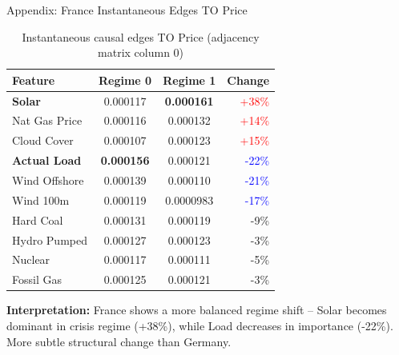 \documentclass[aspectratio=169]{beamer}
\begin{document}
\begin{frame}{Appendix: France Instantaneous Edges TO Price}
\begin{table}
\centering
\scriptsize
\begin{tabular}{l|c|c|r}
\toprule
\textbf{Feature} & \textbf{Regime 0} & \textbf{Regime 1} & \textbf{Change} \\
\midrule
\textbf{Solar} & 0.000117 & \textbf{0.000161} & \textcolor{red}{+38\%} \\
Nat Gas Price & 0.000116 & 0.000132 & \textcolor{red}{+14\%} \\
Cloud Cover & 0.000107 & 0.000123 & \textcolor{red}{+15\%} \\
\midrule
\textbf{Actual Load} & \textbf{0.000156} & 0.000121 & \textcolor{blue}{-22\%} \\
Wind Offshore & 0.000139 & 0.000110 & \textcolor{blue}{-21\%} \\
Wind 100m & 0.000119 & 0.0000983 & \textcolor{blue}{-17\%} \\
\midrule
Hard Coal & 0.000131 & 0.000119 & -9\% \\
Hydro Pumped & 0.000127 & 0.000123 & -3\% \\
Nuclear & 0.000117 & 0.000111 & -5\% \\
Fossil Gas & 0.000125 & 0.000121 & -3\% \\
\bottomrule
\end{tabular}
\caption{Instantaneous causal edges TO Price (adjacency matrix column 0)}
\end{table}

\vspace{0.2cm}
{\scriptsize \textbf{Interpretation:} France shows a more balanced regime shift -- Solar becomes dominant in crisis regime (+38\%), while Load decreases in importance (-22\%). More subtle structural change than Germany.}
\end{frame}
\end{document}
